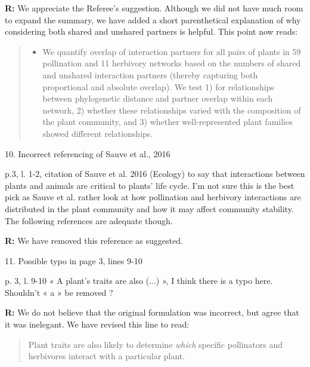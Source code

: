 \documentclass[12pt]{letter}
\newenvironment{refquote}{\bigskip \begin{it}}{\end{it}\smallskip}
\begin{document}
		\textbf{R:} We appreciate the Referee's suggestion. Although we did not have much room to expand the summary, we have added a short parenthetical explanation of why considering both shared and unshared partners is helpful. This point now reads:


		\begin{quotation}

			\begin{itemize}
			\item We quantify overlap of interaction partners for all pairs of plants in 59 pollination and 11 herbivory networks based on the numbers of shared and unshared interaction partners (thereby capturing both proportional and absolute overlap). We test 1) for relationships between phylogenetic distance and partner overlap within each network, 2) whether these relationships varied with the composition of the plant community, and 3) whether well-represented plant families showed different relationships. 
		\end{itemize}

		\end{quotation}


	10. Incorrect referencing of Sauve et al., 2016

		\begin{refquote}
			p.3, l. 1-2, citation of Sauve et al. 2016 (Ecology) to say that interactions between plants and animals are critical to plants’ life cycle. I’m not sure this is the best pick as Sauve et al. rather look at how pollination and herbivory interactions are distributed in the plant community and how it may affect community stability. The following references are adequate though.
		\end{refquote}


		\textbf{R:} We have removed this reference as suggested.


	11. Possible typo in page 3, lines 9-10
		
		\begin{refquote}
			p. 3, l. 9-10 « A plant’s traits are also (...) », I think there is a typo here. Shouldn’t « a » be removed ?
		\end{refquote}


		\textbf{R:} We do not believe that the original formulation was incorrect, but agree that it was inelegant. We have revised this line to read:


		\begin{quotation}
			Plant traits are also likely to determine \emph{which} specific pollinators 
			  and herbivores interact with a particular plant.
	  	\end{quotation}
\end{document}
